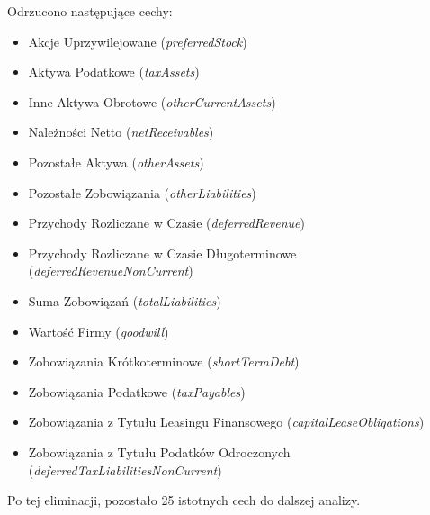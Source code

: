 \documentclass[12pt]{article}
\begin{document}
Odrzucono następujące cechy:
\begin{itemize}
    \item Akcje Uprzywilejowane (\emph{preferredStock})
    \item Aktywa Podatkowe (\emph{taxAssets})
    \item Inne Aktywa Obrotowe (\emph{otherCurrentAssets})
    \item Należności Netto (\emph{netReceivables})
    \item Pozostałe Aktywa (\emph{otherAssets})
    \item Pozostałe Zobowiązania (\emph{otherLiabilities})
    \item Przychody Rozliczane w Czasie (\emph{deferredRevenue})
    \item Przychody Rozliczane w Czasie Długoterminowe (\emph{deferredRevenueNonCurrent})
    \item Suma Zobowiązań (\emph{totalLiabilities})
    \item Wartość Firmy (\emph{goodwill})
    \item Zobowiązania Krótkoterminowe (\emph{shortTermDebt})
    \item Zobowiązania Podatkowe (\emph{taxPayables})
    \item Zobowiązania z Tytułu Leasingu Finansowego (\emph{capitalLeaseObligations})
    \item Zobowiązania z Tytułu Podatków Odroczonych (\emph{deferredTaxLiabilitiesNonCurrent})
\end{itemize}

Po tej eliminacji, pozostało 25 istotnych cech do dalszej analizy.
\end{document}
